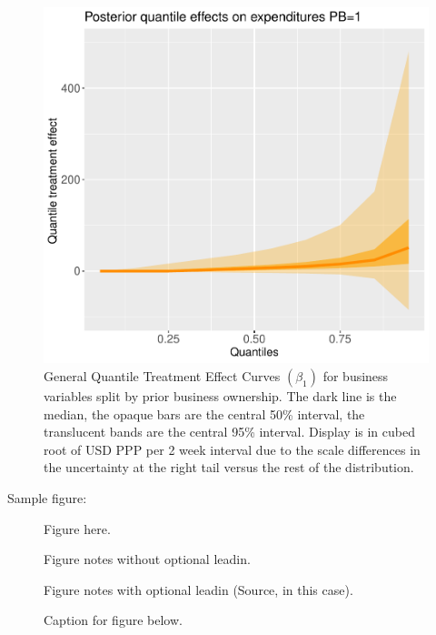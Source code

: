 \documentclass[AER]{AEA}
\begin{document}
\begin{figure}[h!]
    \includegraphics{posterior_parent_quantile_TEs_expenditures_pb_1_lognormal.pdf}
  \caption{ General Quantile Treatment Effect Curves $(\beta_1)$ for business variables split by prior business ownership. The dark line is the median, the opaque bars are the central 50\% interval, the translucent bands are the central 95\% interval. Display is in cubed root of USD PPP per 2 week interval due to the scale differences in the uncertainty at the right tail versus the rest of the distribution. }\label{posterior mean quantiles profit pb split}
\end{figure}









\clearpage \newpage

Sample figure:

\begin{figure}
Figure here.

\caption{Caption for figure below.}
\begin{figurenotes}
Figure notes without optional leadin.
\end{figurenotes}
\begin{figurenotes}[Source]
Figure notes with optional leadin (Source, in this case).
\end{figurenotes}
\end{figure}
\end{document}
